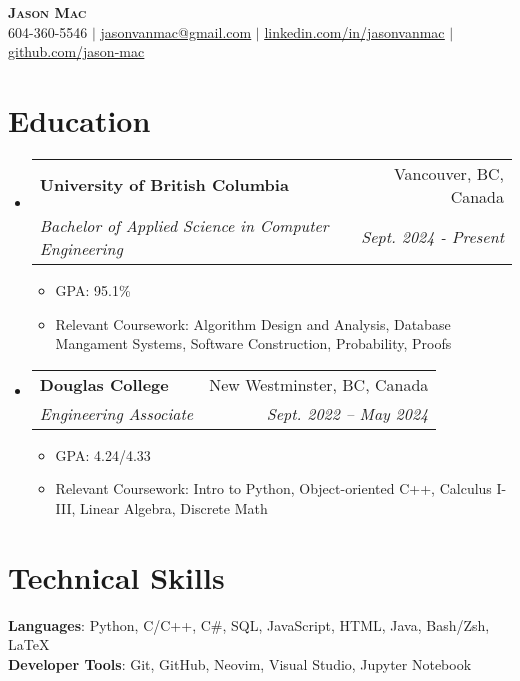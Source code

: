 \documentclass[letterpaper,11pt]{article}
\makeatletter
\newcommand{\resumeItem}[1]{
  \item\small{
    {#1 \vspace{-2pt}}
  }
}
\newcommand{\resumeSubheading}[4]{
  \vspace{-2pt}\item
    \begin{tabular*}{0.97\textwidth}[t]{l@{\extracolsep{\fill}}r}
      \textbf{#1} & #2 \\
      \textit{\small#3} & \textit{\small #4} \\
    \end{tabular*}\vspace{-7pt}
}
\newcommand{\resumeSubHeadingListStart}{\begin{itemize}[leftmargin=0.15in, label={}]}
\newcommand{\resumeSubHeadingListEnd}{\end{itemize}}
\newcommand{\resumeItemListStart}{\begin{itemize}}
\newcommand{\resumeItemListEnd}{\end{itemize}\vspace{-5pt}}
\makeatother
\begin{document}

\begin{center}
	\textbf{\Huge \scshape Jason Mac} \\ \vspace{1pt}
	\small 604-360-5546 $|$ \href{jasonvanmac:@gmail.com}{\underline{jasonvanmac@gmail.com}} $|$
	\href{https://www.linkedin.com/in/jasonvanmac}{\underline{linkedin.com/in/jasonvanmac}} $|$
	\href{https://github.com/jason-mac}{\underline{github.com/jason-mac}}
\end{center}


\section{Education}
\resumeSubHeadingListStart
\resumeSubheading
{University of British Columbia}{Vancouver, BC, Canada}
{Bachelor of Applied Science in Computer Engineering}{Sept. 2024 - Present}
\resumeItemListStart
\resumeItem{GPA: 95.1\%}
\resumeItem{Relevant Coursework: Algorithm Design and Analysis, Database Mangament Systems, Software Construction, Probability, Proofs }
\resumeItemListEnd

\resumeSubheading
{Douglas College}{New Westminster, BC, Canada}
{Engineering Associate}{Sept. 2022 -- May 2024}
\resumeItemListStart
\resumeItem{GPA: 4.24/4.33}
\resumeItem{Relevant Coursework: Intro to Python, Object-oriented C++, Calculus I-III, Linear Algebra, Discrete Math}
\resumeItemListEnd
\resumeSubHeadingListEnd


\section{Technical Skills}
\begin{itemize}[leftmargin=0.15in, label={}]
	\small{\item{
	      \textbf{Languages}{: Python, C/C++, C\#, SQL, JavaScript, HTML, Java, Bash/Zsh, \LaTeX} \\
	      \textbf{Developer Tools}{: Git, GitHub, Neovim, Visual Studio, Jupyter Notebook} \\
	      }}
\end{itemize}
\end{document}
